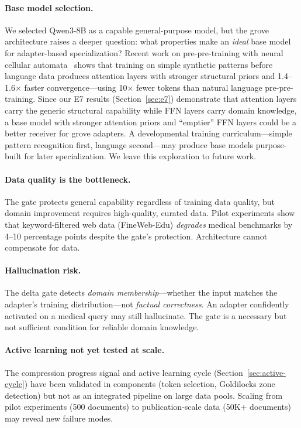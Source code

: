 \documentclass{article}
\begin{document}
\paragraph{Base model selection.}
We selected Qwen3-8B as a capable general-purpose model, but the grove
architecture raises a deeper question: what properties make an
\emph{ideal} base model for adapter-based specialization?
Recent work on pre-pre-training with neural cellular
automata~\cite{lee2026nca} shows that training on simple synthetic
patterns before language data produces attention layers with stronger
structural priors and 1.4--1.6$\times$ faster convergence---using
10$\times$ fewer tokens than natural language pre-pre-training. Since our
E7 results (Section~\ref{sec:e7}) demonstrate that attention layers
carry the generic structural capability while FFN layers carry domain
knowledge, a base model with stronger attention priors and ``emptier''
FFN layers could be a better receiver for grove adapters. A
developmental training curriculum---simple pattern recognition first,
language second---may produce base models purpose-built for later
specialization. We leave this exploration to future work.

\paragraph{Data quality is the bottleneck.}
The gate protects general capability regardless of training data quality,
but domain improvement requires high-quality, curated data. Pilot
experiments show that keyword-filtered web data (FineWeb-Edu)
\emph{degrades} medical benchmarks by 4--10 percentage points despite
the gate's protection. Architecture cannot compensate for data.

\paragraph{Hallucination risk.}
The delta gate detects \emph{domain membership}---whether the input
matches the adapter's training distribution---not \emph{factual
correctness}. An adapter confidently activated on a medical query may
still hallucinate. The gate is a necessary but not sufficient
condition for reliable domain knowledge.

\paragraph{Active learning not yet tested at scale.}
The compression progress signal and active learning cycle
(Section~\ref{sec:active-cycle}) have been validated in components (token
selection, Goldilocks zone detection) but not as an integrated pipeline
on large data pools. Scaling from pilot experiments (500 documents) to
publication-scale data (50K+ documents) may reveal new failure modes.
\end{document}
